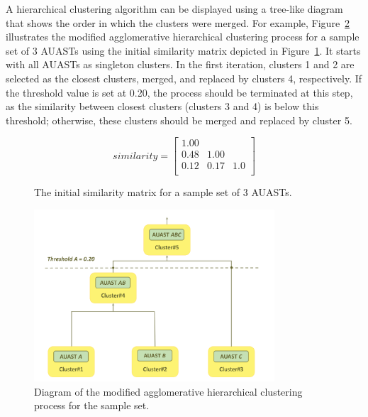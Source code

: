 A hierarchical clustering algorithm can be displayed using a tree-like diagram that shows the order in which the clusters were merged. For example, Figure~\ref{fig:overview2} illustrates the modified agglomerative hierarchical clustering process for a sample set of 3 AUASTs using the initial similarity matrix depicted in Figure~\ref{matrix}. It starts with all AUASTs as singleton clusters. In the first iteration, clusters 1 and 2 are selected as the closest clusters, merged, and replaced by clusters 4, respectively. If the threshold value is set at 0.20, the process should be terminated at this step, as the similarity between closest clusters (clusters 3 and 4) is below this threshold; otherwise, these clusters should be merged and replaced by cluster 5.





\begin{figure}[h]
  \centering
    \centering
   \begin{displaymath}
    similarity = \left[
        \begin{matrix}
        1.00 &  &     \\
0.48 & 1.00 &    \\
0.12 & 0.17 & 1.0   \\
        \end{matrix}   \right]
\end{displaymath}
 \caption{The initial similarity matrix for a sample set of 3 AUASTs.}
  \label{matrix}
  \end{figure}

  \begin{figure} [h]

   \centering\includegraphics [width = 0.8\textwidth]{Drawing4/clustering.pdf}
  \caption{Diagram of the modified agglomerative hierarchical clustering process for the sample set.}
  \label{fig:overview2}
\end{figure}


